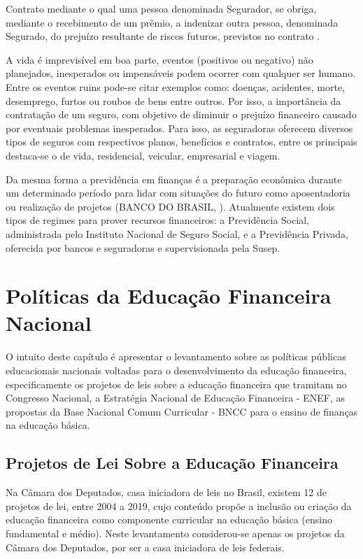 \begin{citacao}
Contrato mediante o qual uma pessoa denominada Segurador, se obriga, mediante o recebimento de um prêmio, a indenizar outra pessoa, denominada Segurado, do prejuízo resultante de riscos futuros, previstos no contrato \cite{susep2007}.
\end{citacao}

A vida é imprevisível em boa parte, eventos (positivos ou negativo) não planejados, inesperados ou impensáveis podem ocorrer com qualquer ser humano. Entre os eventos ruins pode-se citar exemplos como: doenças, acidentes, morte, desemprego, furtos ou roubos de bens entre outros. Por isso, a importância da contratação de um seguro, com objetivo de diminuir o prejuízo financeiro causado por eventuais problemas inesperados. Para isso, as seguradoras oferecem diversos tipos de seguros com respectivos planos, benefícios e contratos, entre os principais destaca-se o de vida, residencial, veicular, empresarial e viagem.

Da mesma forma a previdência em finanças é a preparação econômica durante um determinado período para lidar com situações do futuro como aposentadoria ou realização de projetos (BANCO DO BRASIL, \citeyear{bb2015}). Atualmente existem dois tipos de regimes para prover recursos financeiros: a Previdência Social, administrada pelo Instituto Nacional de Seguro Social, e a Previdência Privada, oferecida por bancos e seguradoras e supervisionada pela Susep.

\section{Políticas da Educação Financeira Nacional}
O intuito deste capítulo é apresentar o levantamento sobre as políticas públicas educacionais nacionais voltadas para o desenvolvimento da educação financeira, especificamente os projetos de leis sobre a educação financeira que tramitam no Congresso Nacional, a Estratégia Nacional de Educação Financeira - ENEF, as propostas da Base Nacional Comum Curricular - BNCC para o ensino de finanças na educação básica.

\subsection{Projetos de Lei Sobre a Educação Financeira}
Na Câmara dos Deputados, casa iniciadora de leis no Brasil, existem 12 de projetos de lei, entre 2004 a 2019, cujo conteúdo propõe a inclusão ou criação da educação financeira como componente curricular na educação básica (ensino fundamental e médio). Neste levantamento considerou-se apenas os projetos da Câmara dos Deputados, por ser a casa iniciadora de leis federais.

